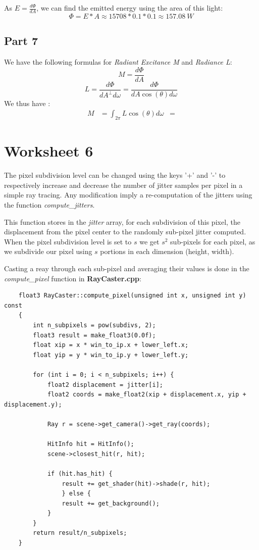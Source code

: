 \documentclass[a4,12pt]{article}
\begin{document}
	As $E = \frac{d\Phi}{dA}$, we can find the emitted energy using the area of this light:
	$$
	\Phi = E*A \approx 15708*0.1*0.1 \approx \boxed{157.08\ W}
	$$
	
	\subsection{Part 7}
	We have the following formulas for \textit{Radiant Excitance M} and \textit{Radiance L}:
	$$
	M = \frac{d\Phi}{dA}
	$$
	$$
	L = \frac{d\Phi}{dA^\perp d\omega} = \frac{d\Phi}{dA \cos(\theta)d\omega}
	$$
	We thus have :
	\begin{align*}
		M &= \int_{2\pi} L\cos(\theta)d\omega
		&= 
	\end{align*}
	
	\section{Worksheet 6}
	The pixel subdivision level can be changed using the keys '+' and '-' to respectively increase and decrease the number of jitter samples per pixel in a simple ray tracing. Any modification imply a re-computation of the jitters using the function \textit{compute\_jitters}.
	
	This function stores in the \textit{jitter} array, for each subdivision of this pixel, the displacement from the pixel center to the randomly sub-pixel jitter computed. When the pixel subdivision level is set to $s$ we get $s^2$ sub-pixels for each pixel, as we subdivide our pixel using $s$ portions in each dimension (height, width).
	
	Casting a reay through each sub-pixel and averaging their values is done in the \textit{compute\_pixel} function in \textbf{RayCaster.cpp}:
	
	\begin{lstlisting}
	float3 RayCaster::compute_pixel(unsigned int x, unsigned int y) const
	{
		int n_subpixels = pow(subdivs, 2);
		float3 result = make_float3(0.0f);
		float xip = x * win_to_ip.x + lower_left.x;
		float yip = y * win_to_ip.y + lower_left.y;
		
		for (int i = 0; i < n_subpixels; i++) {
			float2 displacement = jitter[i];
			float2 coords = make_float2(xip + displacement.x, yip + displacement.y);
			
			Ray r = scene->get_camera()->get_ray(coords);
			
			HitInfo hit = HitInfo();
			scene->closest_hit(r, hit);
			
			if (hit.has_hit) {
				result += get_shader(hit)->shade(r, hit);
				} else {
				result += get_background();
			}
		}
		return result/n_subpixels;
	}
	\end{lstlisting}
	
\end{document}
